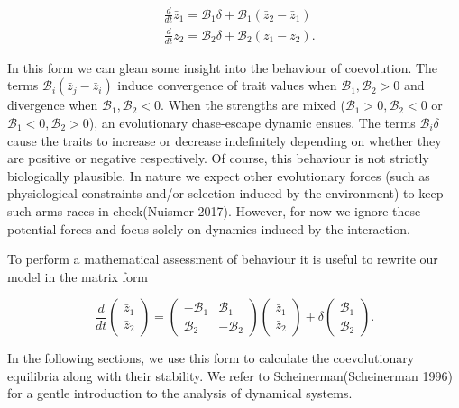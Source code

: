 \documentclass[]{article}
\begin{document}
\begin{equation}
\begin{matrix}&\frac{d}{dt}\bar z_1=\mathscr{B}_1\delta+\mathscr{B}_1(\bar z_2-\bar z_1)\\ & \frac{d}{dt}\bar z_2=\mathscr{B}_2\delta+\mathscr{B}_2(\bar z_1-\bar z_2).\end{matrix}
\end{equation}

In this form we can glean some insight into the behaviour of
coevolution. The terms \(\mathscr{B}_i(\bar z_j-\bar z_i)\) induce
convergence of trait values when \(\mathscr{B}_1,\mathscr{B}_2>0\) and
divergence when \(\mathscr{B}_1,\mathscr{B}_2<0\). When the strengths
are mixed (\(\mathscr{B}_1>0,\mathscr{B}_2<0\) or
\(\mathscr{B}_1<0,\mathscr{B}_2>0\)), an evolutionary chase-escape
dynamic ensues. The terms \(\mathscr{B}_i\delta\) cause the traits to
increase or decrease indefinitely depending on whether they are positive
or negative respectively. Of course, this behaviour is not strictly
biologically plausible. In nature we expect other evolutionary forces
(such as physiological constraints and/or selection induced by the
environment) to keep such arms races in check(Nuismer 2017). However,
for now we ignore these potential forces and focus solely on dynamics
induced by the interaction.

To perform a mathematical assessment of behaviour it is useful to
rewrite our model in the matrix form

\begin{equation}
\frac{d}{dt}\left(\begin{matrix}\bar z_1\\\bar z_2\end{matrix}\right)=\left(\begin{matrix}-\mathscr{B}_1&\mathscr{B}_1\\\mathscr{B}_2&-\mathscr{B}_2\end{matrix}\right)\left(\begin{matrix}\bar z_1\\\bar z_2\end{matrix}\right)+\delta\left(\begin{matrix}\mathscr{B}_1\\\mathscr{B}_2\end{matrix}\right).
\end{equation}

In the following sections, we use this form to calculate the
coevolutionary equilibria along with their stability. We refer to
Scheinerman(Scheinerman 1996) for a gentle introduction to the analysis
of dynamical systems.
\end{document}
